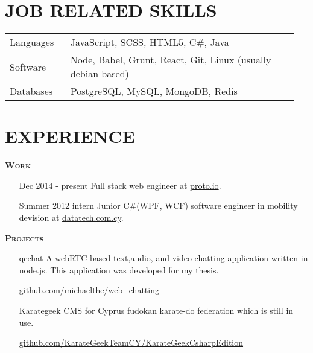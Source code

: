\documentclass[margin, 10pt]{res} %
\begin{document}
\begin{resume}
\begin{tabular}{p{0.2\linewidth} p{0.75\linewidth}}
\end{tabular}

\section{JOB RELATED SKILLS}

\begin{tabular}{p{0.2\linewidth} p{0.75\linewidth}}

Languages & JavaScript, SCSS, HTML5, C\#, Java \\
Software & Node, Babel, Grunt, React, Git, Linux (usually debian based) \\
Databases & PostgreSQL, MySQL, MongoDB, Redis

\end{tabular}

\section{EXPERIENCE}

\textsc{ \textbf{Work}}

\begin{itemize}

\item[Dec 2014 - present] Full stack web engineer at
\href{https://proto.io/}{proto.io}. \\

\item[Summer 2012 intern] Junior C\#(WPF, WCF) software engineer in mobility devision at
\href{http://www.datatech.com.cy/}{datatech.com.cy}. \\

\end{itemize}

\textsc{ \textbf{Projects}}

\begin{itemize}

\item[qcchat] A webRTC based text,audio, and video chatting application written in node.js.
This application was developed for my thesis.

\href{https://github.com/michaelthe/web_chatting}{github.com/michaelthe/web\_chatting} \\

\item[Karategeek] CMS for Cyprus fudokan karate-do federation which is still in use.

\href{https://github.com/KarateGeekTeamCY/KarateGeekCsharpEdition/tree/baseV4.5.1}{github.com/KarateGeekTeamCY/KarateGeekCsharpEdition} \\


\end{itemize}
\end{resume}
\end{document}
